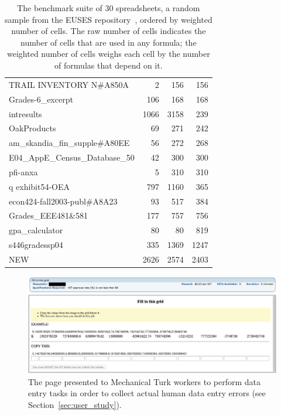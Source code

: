 \begin{table}[t!]
\begin{tabular}{l|rrr}
\small{TRAIL INVENTORY N\#A850A} & \small{2} & \small{156} & \small{156} \\ 
\small{Grades-6\_excerpt} & \small{106} & \small{168} & \small{168} \\ 
\small{intresults} & \small{1066} & \small{3158} & \small{239} \\ 
\small{OakProducts} & \small{69} & \small{271} & \small{242} \\ 
\small{am\_skandia\_fin\_supple\#A80EE} & \small{56} & \small{272} & \small{268} \\ 
\small{E04\_AppE\_Census\_Database\_50} & \small{42} & \small{300} & \small{300} \\ 
\small{pfi-anxa} & \small{5} & \small{310} & \small{310} \\ 
\small{q exhibit54-OEA} & \small{797} & \small{1160} & \small{365} \\ 
\small{econ424-fall2003-publ\#A8A23} & \small{93} & \small{517} & \small{384} \\ 
\small{Grades\_EEE481\&581} & \small{177} & \small{757} & \small{756} \\ 
\small{gpa\_calculator} & \small{80} & \small{80} & \small{819} \\ 
\small{s446gradessp04} & \small{335} & \small{1369} & \small{1247} \\ 
\small{NEW} & \small{2626} & \small{2574} & \small{2403} \\ 
    \hline
    \end{tabular}%
  \caption{The benchmark suite of 30 spreadsheets, a random sample from the EUSES repository~\cite{Fisher:2005:ESC:1082983.1083242}, ordered by weighted number of cells. The raw number of cells indicates the number of cells that are used in any formula; the weighted number of cells weighs each cell by the number of formulas that depend on it.\label{tab:spreadsheet_characteristics}}
\end{table}

\begin{figure}[!t]
\centering
\includegraphics[width=5in]{images/mturk_fuzz_task}
  \caption{The page presented to Mechanical Turk workers to perform data entry tasks in order to collect actual human data entry errors (see Section~\ref{sec:user_study}).\label{fig:mturk_task}}
\end{figure}
